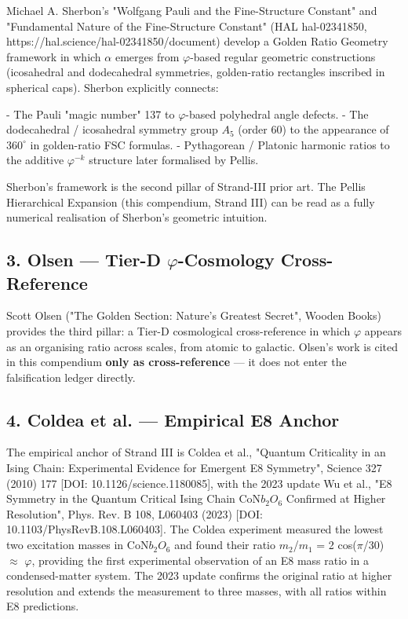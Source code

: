 Michael A. Sherbon's "Wolfgang Pauli and the Fine-Structure Constant" and "Fundamental Nature of the Fine-Structure Constant" (HAL hal-02341850, https://hal.science/hal-02341850/document) develop a Golden Ratio Geometry framework in which $\alpha$ emerges from $\varphi$-based regular geometric constructions (icosahedral and dodecahedral symmetries, golden-ratio rectangles inscribed in spherical caps). Sherbon explicitly connects:

- The Pauli "magic number" 137 to $\varphi$-based polyhedral angle defects.
- The dodecahedral / icosahedral symmetry group $A_{5}$ (order 60) to the appearance of 36$0^{\circ}$ in golden-ratio FSC formulas.
- Pythagorean / Platonic harmonic ratios to the additive $\varphi^{-k}$ structure later formalised by Pellis.

Sherbon's framework is the second pillar of Strand-III prior art. The Pellis Hierarchical Expansion (this compendium, Strand III) can be read as a fully numerical realisation of Sherbon's geometric intuition.

\subsection{3. Olsen --- Tier-D $\varphi$-Cosmology Cross-Reference}

Scott Olsen ("The Golden Section: Nature's Greatest Secret", Wooden Books) provides the third pillar: a Tier-D cosmological cross-reference in which $\varphi$ appears as an organising ratio across scales, from atomic to galactic. Olsen's work is cited in this compendium \textbf{only as cross-reference} --- it does not enter the falsification ledger directly.

\subsection{4. Coldea et al. --- Empirical E8 Anchor}

The empirical anchor of Strand III is Coldea et al., "Quantum Criticality in an Ising Chain: Experimental Evidence for Emergent E8 Symmetry", Science 327 (2010) 177 [DOI: 10.1126/science.1180085], with the 2023 update Wu et al., "E8 Symmetry in the Quantum Critical Ising Chain CoN$b_{2}$$O_{6}$ Confirmed at Higher Resolution", Phys. Rev. B 108, L060403 (2023) [DOI: 10.1103/PhysRevB.108.L060403]. The Coldea experiment measured the lowest two excitation masses in CoN$b_{2}$$O_{6}$ and found their ratio $m_{2}$/$m_{1}$ = 2 cos($\pi$/30) $\approx$ $\varphi$, providing the first experimental observation of an E8 mass ratio in a condensed-matter system. The 2023 update confirms the original ratio at higher resolution and extends the measurement to three masses, with all ratios within E8 predictions.

